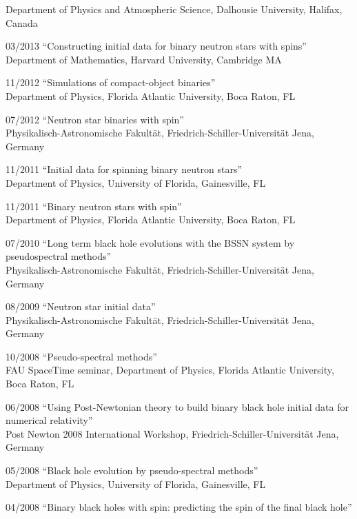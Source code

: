\documentclass[11pt]{article}
\begin{document}
\begin{list}{}{\leftmargin=5em =1.5em \rightmargin=-8em =7em}
		{Department of Physics and Atmospheric Science},
		{Dalhousie University, Halifax,\\}
		 Canada
\item[03/2013]	``Constructing initial data for binary neutron stars with 
		spins''\\
		{Department of Mathematics},
		{Harvard University, Cambridge MA}
\item[11/2012]	``Simulations of compact-object binaries''\\
		{Department of Physics},
		{Florida Atlantic University, Boca Raton, FL}
\item[07/2012]	``Neutron star binaries with spin''\\
		{Physikalisch-Astronomische Fakult\"at},
		{Friedrich-Schiller-Universit\"at Jena, Germany}
\item[11/2011]	``Initial data for spinning binary neutron stars''\\
		{Department of Physics},
		{University of Florida, Gainesville, FL}
\item[11/2011]	``Binary neutron stars with spin''\\
		{Department of Physics},
		{Florida Atlantic University, Boca Raton, FL}
\item[07/2010]	``Long term black hole evolutions with the BSSN system by
		pseudospectral methods''\\
		{Physikalisch-Astronomische Fakult\"at},
		{Friedrich-Schiller-Universit\"at Jena, Germany}
\item[08/2009]	``Neutron star initial data''\\
		{Physikalisch-Astronomische Fakult\"at},
		{Friedrich-Schiller-Universit\"at Jena, Germany}
\item[10/2008]	``Pseudo-spectral methods''\\
		{FAU SpaceTime seminar, Department of Physics},
		{Florida Atlantic University, Boca Raton, FL}
\item[06/2008]	``Using Post-Newtonian theory to build binary black
                    hole initial data for numerical relativity''\\
		{Post Newton 2008 International Workshop},
		{Friedrich-Schiller-Universit\"at Jena, Germany}
\item[05/2008]	``Black hole evolution by pseudo-spectral methods''\\
		{Department of Physics},
		{University of Florida, Gainesville, FL}
\item[04/2008]	``Binary black holes with spin: predicting the spin of
		    the final black hole''\\

\end{list}
\end{document}
